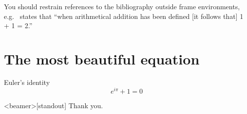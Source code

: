 You should restrain references to the bibliography outside frame environments, e.g.~\citet{newton1687} states that ``when arithmetical addition has been defined [it follows that] 1 + 1 = 2.''\cite{newton1687}

\section{The most beautiful equation}

\begin{frame}{Euler's identity}
  \begin{equation}
    e^{i\pi} + 1 = 0
  \end{equation}
\end{frame}

\begin{frame}<beamer>[standout]
  Thank you.
\end{frame}





